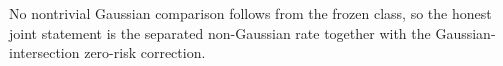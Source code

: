 No nontrivial Gaussian comparison follows from the frozen class, so the honest joint statement is the separated non-Gaussian rate together with the Gaussian-intersection zero-risk correction.